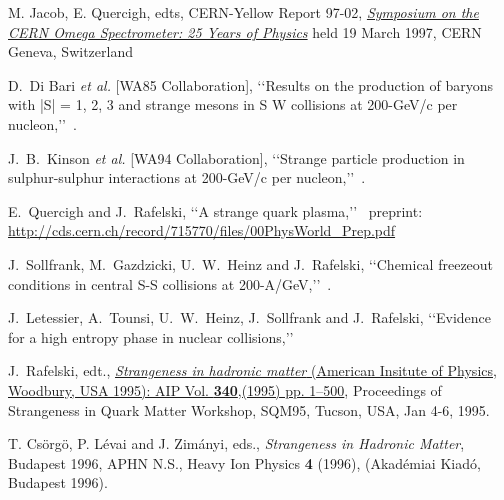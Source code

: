 \begin{thebibliography}{100}
M. Jacob,  E. Quercigh, edts, CERN-Yellow Report 97-02, \href{http://cds.cern.ch/record/330556/files/CERN-97-02.pdf}{\textit{Symposium on the CERN Omega Spectrometer: 25 Years of Physics}} held 19 March 1997, CERN Geneva, Switzerland
 


 D.~Di Bari {\it et al.} [WA85 Collaboration],
 \lq\lq Results on the production of baryons with |S| = 1, 2, 3 and strange mesons in S W collisions at 200-GeV/c per nucleon,\rq\rq\
 .
 

 J.~B.~Kinson {\it et al.} [WA94 Collaboration],
 \lq\lq Strange particle production in sulphur-sulphur interactions at 200-GeV/c per nucleon,\rq\rq\
 .


  E.~Quercigh and J.~Rafelski,
\lq\lq A strange quark plasma,\rq\rq\
  preprint: \url{http://cds.cern.ch/record/715770/files/00PhysWorld_Prep.pdf}
  
 
 J.~Sollfrank, M.~Gazdzicki, U.~W.~Heinz and J.~Rafelski,
\lq\lq Chemical freezeout conditions in central S-S collisions at 200-A/GeV,\rq\rq\ .
 
 

  J.~Letessier, A.~Tounsi, U.~W.~Heinz, J.~Sollfrank and J.~Rafelski,
\lq\lq Evidence for a high entropy phase in nuclear collisions,\rq\rq\
 
\bibitem{Rafelski:1995zq}
 J.~Rafelski, edt.,
\href{http://scitation.aip.org/content/aip/proceeding/aipcp/340}{{\it Strangeness in hadronic matter} (American Insitute of Physics, Woodbury, USA 1995): AIP  Vol. \textbf{340},(1995) pp. 1--500}, Proceedings of Strangeness in Quark Matter Workshop, SQM95, Tucson, USA, Jan 4-6, 1995.

\bibitem{S96} T. Cs\"org\"o, P. L\'evai and J. Zim\'anyi, eds.,
{\it  Strangeness in Hadronic Matter}, Budapest 1996,
 APHN N.S., Heavy Ion Physics  {\bf 4}  (1996),
(Akad\'emiai Kiad\'o, Budapest 1996).


\end{thebibliography}
